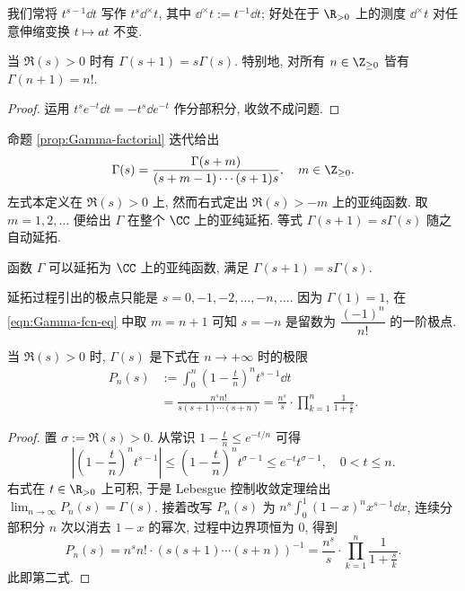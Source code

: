 \begin{convention}
	我们常将 $t^{s-1} \dd t$ 写作 $t^s \dd^\times t$, 其中 $\dd^\times t := t^{-1} \dd t$; 好处在于 $\R_{>0}$ 上的测度 $\dd^\times t$ 对任意伸缩变换 $t \mapsto at$ 不变.
\end{convention}

\begin{proposition}\label{prop:Gamma-factorial}
	当 $\Re(s) > 0$ 时有 $\Gamma(s+1) = s\Gamma(s)$. 特别地, 对所有 $n \in \Z_{\geq 0}$ 皆有 $\Gamma(n+1) = n!$.
\end{proposition}
\begin{proof}
	运用 $t^s e^{-t}\dd t = - t^s \dd e^{-t}$ 作分部积分, 收敛不成问题.
\end{proof}

命题 \ref{prop:Gamma-factorial} 迭代给出
\begin{equation}\label{eqn:Gamma-fcn-eq}
	\Gamma(s) = \frac{\Gamma(s+m)}{(s+m-1) \cdots (s+1) s}, \quad m \in \Z_{\geq 0}.
\end{equation}
左式本定义在 $\Re(s) > 0$ 上, 然而右式定出 $\Re(s) > -m$ 上的亚纯函数. 取 $m = 1,2, \ldots$ 便给出 $\Gamma$ 在整个 $\CC$ 上的亚纯延拓. 等式 $\Gamma(s+1) = s\Gamma(s)$ 随之自动延拓.

\begin{corollary}
	函数 $\Gamma$ 可以延拓为 $\CC$ 上的亚纯函数, 满足 $\Gamma(s + 1) = s\Gamma(s)$.
\end{corollary}

延拓过程引出的极点只能是 $s=0,-1,-2, \ldots, -n, \ldots$. 因为 $\Gamma(1) = 1$, 在 \eqref{eqn:Gamma-fcn-eq} 中取 $m=n+1$ 可知 $s = -n$ 是留数为 $\dfrac{(-1)^n}{n!}$ 的一阶极点.

\begin{lemma}\label{prop:Gamma-approx}
	当 $\Re(s) > 0$ 时, $\Gamma(s)$ 是下式在 $n \to +\infty$ 时的极限
	\begin{align*}
		P_n(s) & := \int_0^n \left( 1 - \frac{t}{n} \right)^n t^{s-1} \dd t \\
		& = \frac{n^s n!}{s(s+1) \cdots (s+n)} = \frac{n^s}{s} \cdot \prod_{k=1}^n \frac{1}{1 + \frac{s}{k}}.
	\end{align*}
\end{lemma}
\begin{proof}
	置 $\sigma := \Re(s) > 0$. 从常识 $1 - \frac{t}{n} \leq e^{-t/n}$ 可得
	\[ \left| \left( 1 - \frac{t}{n} \right)^n t^{s-1} \right| \leq \left(1 - \frac{t}{n} \right)^n t^{\sigma-1} \leq e^{-t} t^{\sigma-1}, \quad 0 < t \leq n . \]
	右式在 $t \in \R_{> 0}$ 上可积, 于是 Lebesgue 控制收敛定理给出 $\lim_{n \to \infty} P_n(s) = \Gamma(s)$. 接着改写 $P_n(s)$ 为 $n^s \int_0^1 (1-x)^n x^{s-1} \dd x$, 连续分部积分 $n$ 次以消去 $1-x$ 的幂次, 过程中边界项恒为 $0$, 得到
	\[ P_n(s) = n^s n! \cdot (s(s+1) \cdots (s+n))^{-1} = \frac{n^s}{s} \cdot \prod_{k=1}^n \frac{1}{1 + \frac{s}{k}}. \]
	此即第二式.
\end{proof}

